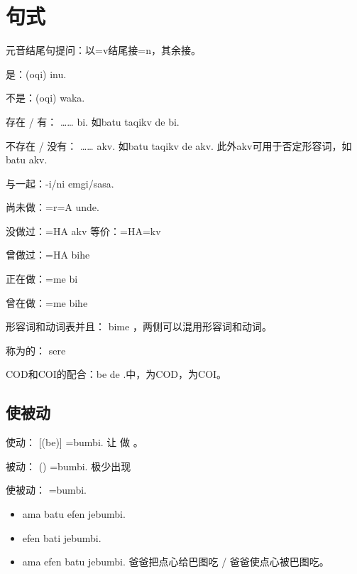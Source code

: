 \section{句式}

元音结尾句提问：以=v结尾接=n，其余接。

是：\A (oqi) \B inu.

不是：\A (oqi) \B waka.

存在 / 有： …… bi. 如batu taqikv de bi.

不存在 / 没有： …… akv. 如batu taqikv de akv. 此外akv可用于否定形容词，如batu    akv.

\A 与\B 一起：\A \B -i/ni emgi/sasa.

尚未做：\V =r=A unde.

没做过：\V =HA akv 等价：\V =HA=kv

曾做过：\V =HA bihe

正在做：\V =me bi

曾在做：\V =me bihe

形容词和动词表并且： bime ，两侧可以混用形容词和动词。

称为\A 的\B ： \A sere \B 

COD和COI的配合：\A \B be \C de .中，\B 为COD，\C 为COI。

\subsection{使被动}

使动：\A \B {} [\C (be)] \V =bumbi. \A 让 \B 做 \V \C 。

被动：\A \B {} (\C) \V =bumbi. \C 极少出现

使被动：\A \B {} \C {} \V =bumbi. 

\begin{itemize}
    \item ama batu  efen jebumbi.
    \item efen bati  jebumbi.
    \item ama efen  batu  jebumbi. 爸爸把点心给巴图吃 / 爸爸使点心被巴图吃。
\end{itemize}




